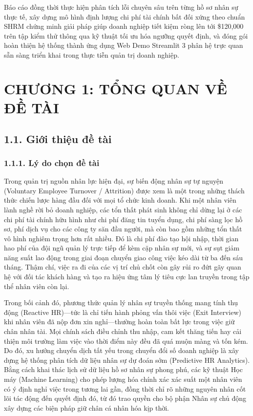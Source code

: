 \documentclass[12pt,a4paper]{article}
\begin{document}
Báo cáo đồng thời thực hiện phân tích lỗi chuyên sâu trên từng hồ sơ nhân sự thực tế, xây dựng mô hình định lượng chi phí tài chính bất đối xứng theo chuẩn SHRM chứng minh giải pháp giúp doanh nghiệp tiết kiệm ròng lên tới \$120,000 trên tập kiểm thử thông qua kỹ thuật tối ưu hóa ngưỡng quyết định, và đóng gói hoàn thiện hệ thống thành ứng dụng Web Demo Streamlit 3 phân hệ trực quan sẵn sàng triển khai trong thực tiễn quản trị doanh nghiệp.

\newpage
\tableofcontents
\newpage
\listoffigures
\newpage
\listoftables
\newpage


\newpage
\section{CHƯƠNG 1: TỔNG QUAN VỀ ĐỀ TÀI}

\subsection{1.1. Giới thiệu đề tài}

\subsubsection{1.1.1. Lý do chọn đề tài}
Trong quản trị nguồn nhân lực hiện đại, sự biến động nhân sự tự nguyện (Voluntary Employee Turnover / Attrition) được xem là một trong những thách thức chiến lược hàng đầu đối với mọi tổ chức kinh doanh. Khi một nhân viên lành nghề rời bỏ doanh nghiệp, các tổn thất phát sinh không chỉ dừng lại ở các chi phí tài chính hữu hình như chi phí đăng tin tuyển dụng, chi phí sàng lọc hồ sơ, phí dịch vụ cho các công ty săn đầu người, mà còn bao gồm những tổn thất vô hình nghiêm trọng hơn rất nhiều. Đó là chi phí đào tạo hội nhập, thời gian hao phí của đội ngũ quản lý trực tiếp để kèm cặp nhân sự mới, và sự sụt giảm năng suất lao động trong giai đoạn chuyển giao công việc kéo dài từ ba đến sáu tháng. Thậm chí, việc ra đi của các vị trí chủ chốt còn gây rủi ro đứt gãy quan hệ với đối tác khách hàng và tạo ra hiệu ứng tâm lý tiêu cực lan truyền trong tập thể nhân viên còn lại.

Trong bối cảnh đó, phương thức quản lý nhân sự truyền thống mang tính thụ động (Reactive HR)—tức là chỉ tiến hành phỏng vấn thôi việc (Exit Interview) khi nhân viên đã nộp đơn xin nghỉ—thường hoàn toàn bất lực trong việc giữ chân nhân tài. Mọi chính sách điều chỉnh thu nhập, cam kết thăng tiến hay cải thiện môi trường làm việc vào thời điểm này đều đã quá muộn màng và tốn kém. Do đó, xu hướng chuyển dịch tất yếu trong chuyển đổi số doanh nghiệp là xây dựng hệ thống phân tích dữ liệu nhân sự dự đoán sớm (Predictive HR Analytics). Bằng cách khai thác lịch sử dữ liệu hồ sơ nhân sự phong phú, các kỹ thuật Học máy (Machine Learning) cho phép lượng hóa chính xác xác suất một nhân viên có ý định nghỉ việc trong tương lai gần, đồng thời chỉ rõ những nguyên nhân cốt lõi tác động đến quyết định đó, từ đó trao quyền cho bộ phận Nhân sự chủ động xây dựng các biện pháp giữ chân cá nhân hóa kịp thời.
\end{document}
